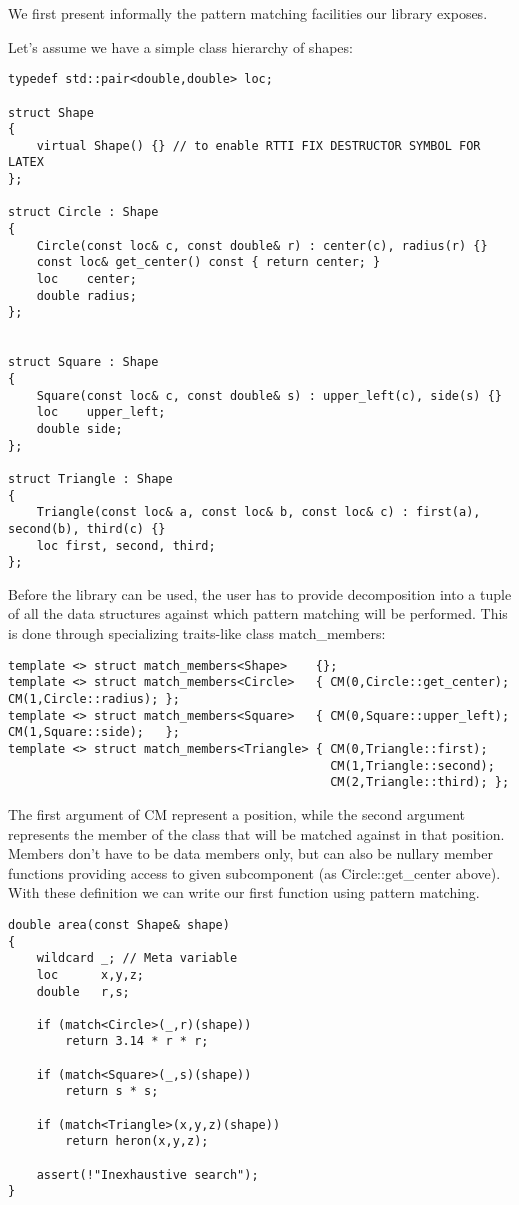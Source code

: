 \documentclass[submission,copyright]{eptcs}
\begin{document}
We first present informally the pattern matching facilities our library exposes.

Let's assume we have a simple class hierarchy of shapes:

\begin{lstlisting}
typedef std::pair<double,double> loc;

struct Shape
{
    virtual Shape() {} // to enable RTTI FIX DESTRUCTOR SYMBOL FOR LATEX
};

struct Circle : Shape
{
    Circle(const loc& c, const double& r) : center(c), radius(r) {}
    const loc& get_center() const { return center; }
    loc    center;
    double radius;
};


struct Square : Shape
{
    Square(const loc& c, const double& s) : upper_left(c), side(s) {}
    loc    upper_left;
    double side;
};

struct Triangle : Shape
{
    Triangle(const loc& a, const loc& b, const loc& c) : first(a), second(b), third(c) {}
    loc first, second, third;
};
\end{lstlisting}

Before the library can be used, the user has to provide decomposition into a 
tuple of all the data structures against which pattern matching will be 
performed. This is done through specializing traits-like class match\_members:

\begin{lstlisting}
template <> struct match_members<Shape>    {};
template <> struct match_members<Circle>   { CM(0,Circle::get_center); CM(1,Circle::radius); };
template <> struct match_members<Square>   { CM(0,Square::upper_left); CM(1,Square::side);   };
template <> struct match_members<Triangle> { CM(0,Triangle::first);    
                                             CM(1,Triangle::second); 
                                             CM(2,Triangle::third); };
\end{lstlisting}

The first argument of CM represent a position, while the second argument 
represents the member of the class that will be matched against in that position. 
Members don't have to be data members only, but can also be nullary member 
functions providing access to given subcomponent (as Circle::get\_center above).
With these definition we can write our first function using pattern matching.

\begin{lstlisting}
double area(const Shape& shape)
{
    wildcard _; // Meta variable
    loc      x,y,z;
    double   r,s;

    if (match<Circle>(_,r)(shape))
        return 3.14 * r * r;

    if (match<Square>(_,s)(shape))
        return s * s;

    if (match<Triangle>(x,y,z)(shape))
        return heron(x,y,z);

    assert(!"Inexhaustive search");
}
\end{lstlisting}
\end{document}
